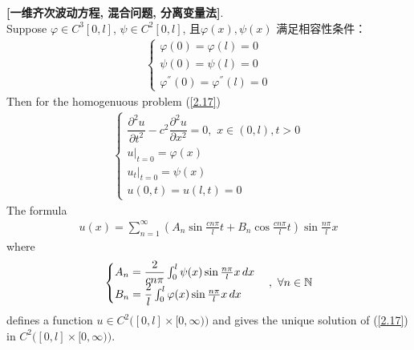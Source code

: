 	\begin{thm}\label{thm 2.3.5}
		\textbf{[一维齐次波动方程, 混合问题, 分离变量法]}. \\
		Suppose $\varphi \in C^3[0 , l]$, $\psi \in C^2[0 , l]$, 且$\varphi(x) , \psi(x)$ 满足相容性条件：
		\begin{align*}
			\begin{cases}
				\varphi(0) = \varphi(l) = 0 \\
				\psi(0) = \psi(l) = 0 \\
				\varphi^{''}(0) = \varphi^{''}(l) = 0
			\end{cases}
		\end{align*}
		Then for the homogenuous problem (\ref{2.17})
		\begin{align*}
			\begin{cases}
				\dfrac{\partial^2 u}{\partial t^2} - c^2 \dfrac{\partial^2 u}{\partial x^2} = 0 , \,\, x \in (0 , l) , t > 0 \\
				u \Big|_{t = 0} = \varphi(x) \\
				u_t \Big|_{t = 0} = \psi(x) \\
				u(0 , t) = u(l , t) = 0
			\end{cases}
		\end{align*}
		The formula
		\begin{align}
			u(x) = \sum_{n = 1}^{\infty} \left( A_n \sin \frac{cn\pi}{l} t + B_n \cos \frac{cn\pi}{l} t \right) \sin \frac{n\pi}{l} x \label{2.18}
		\end{align}
		where 
		\begin{align}
			\begin{cases}
				A_n = \dfrac{2}{cn\pi} \int_{0}^l \psi(x) \sin \frac{n\pi}{l} x \, dx \\
				B_n = \dfrac{2}{l} \int_{0}^l \varphi(x) \sin \frac{n\pi}{l} x \, dx 
			\end{cases}, \,\, \forall n \in \mathbb{N} \label{2.19}
		\end{align}
		defines a function $u \in C^{2}\Big( [0 , l] \times [0 , \infty) \Big)$ and gives the unique solution of (\ref{2.17}) in $C^{2}\Big( [0 , l] \times [0 , \infty) \Big)$. 
		
		\vspace*{6em}
		

\end{thm}
